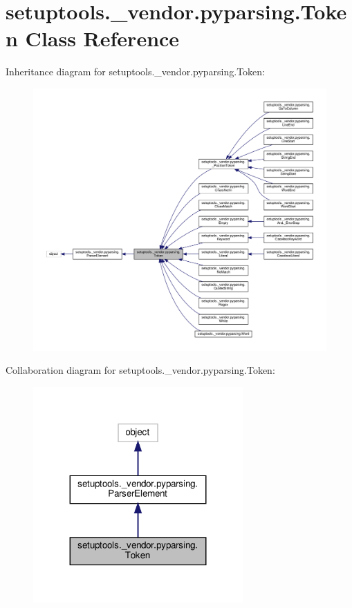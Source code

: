 \hypertarget{classsetuptools_1_1__vendor_1_1pyparsing_1_1Token}{}\section{setuptools.\+\_\+vendor.\+pyparsing.\+Token Class Reference}
\label{classsetuptools_1_1__vendor_1_1pyparsing_1_1Token}


Inheritance diagram for setuptools.\+\_\+vendor.\+pyparsing.\+Token\+:
\nopagebreak
\begin{figure}[H]
\begin{center}
\leavevmode
\includegraphics[width=350pt]{classsetuptools_1_1__vendor_1_1pyparsing_1_1Token__inherit__graph}
\end{center}
\end{figure}


Collaboration diagram for setuptools.\+\_\+vendor.\+pyparsing.\+Token\+:
\nopagebreak
\begin{figure}[H]
\begin{center}
\leavevmode
\includegraphics[width=227pt]{classsetuptools_1_1__vendor_1_1pyparsing_1_1Token__coll__graph}
\end{center}
\end{figure}
